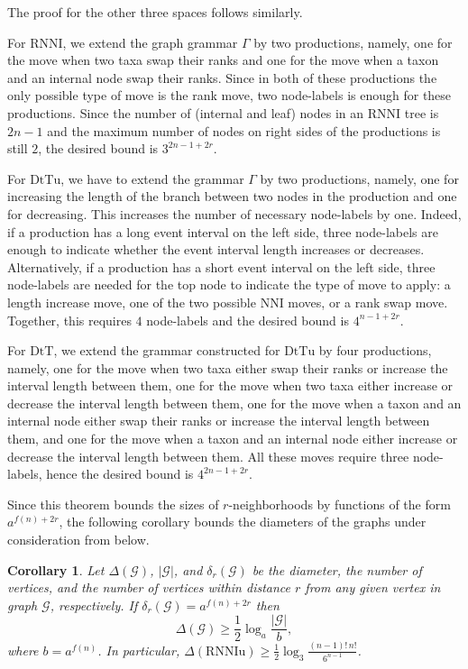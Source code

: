 \documentclass[11pt]{amsart}
\newtheorem{corollary}[lemma]{Corollary}
\theoremstyle{definition}
\newcommand{\nni}{\mathrm{NNI}}
\newcommand{\rnni}{\mathrm{RNNI}}
\newcommand{\rnniu}{\mathrm{RNNIu}}
\newcommand{\dtt}{\mathrm{DtT}}
\newcommand{\dttu}{\mathrm{DtTu}}
\newcommand{\G}{\mathcal{G}}
\begin{document}
The proof for the other three spaces follows similarly.

For $\rnni$, we extend the graph grammar $\Gamma$ by two productions, namely, one for the move when two taxa swap their ranks and one for the move when a taxon and an internal node swap their ranks.
Since in both of these productions the only possible type of move is the rank move, two node-labels is enough for these productions.
Since the number of (internal and leaf) nodes in an $\rnni$ tree is $2n - 1$ and the maximum number of nodes on right sides of the productions is still $2$, the desired bound is $3^{2n-1 + 2r}$.

For $\dttu$, we have to extend the grammar $\Gamma$ by two productions, namely, one for increasing the length of the branch between two nodes in the production and one for decreasing.
This increases the number of necessary node-labels by one.
Indeed, if a production has a long event interval on the left side, three node-labels are enough to indicate whether the event interval length increases or decreases.
Alternatively, if a production has a short event interval on the left side, three node-labels are needed for the top node to indicate the type of move to apply: a length increase move, one of the two possible $\nni$ moves, or a rank swap move.
Together, this requires $4$ node-labels and the desired bound is $4^{n-1 + 2r}$.

For $\dtt$, we extend the grammar constructed for $\dttu$ by four productions, namely, one for the move when two taxa either swap their ranks or increase the interval length between them, one for the move when two taxa either increase or decrease the interval length between them, one for the move when a taxon and an internal node either swap their ranks or increase the interval length between them, and one for the move when a taxon and an internal node either increase or decrease the interval length between them.
All these moves require three node-labels, hence the desired bound is $4^{2n-1 + 2r}$.
\endproof

Since this theorem bounds the sizes of $r$-neighborhoods by functions of the form $a^{f(n) + 2r}$, the following corollary bounds the diameters of the graphs under consideration from below.

\begin{corollary}
Let $\Delta(\G)$, $|\G|$, and $\delta_r(\G)$ be the diameter, the number of vertices, and the number of vertices within distance $r$ from any given vertex in graph $\G$, respectively.
If $\delta_r(\G) = a^{f(n) + 2r}$ then
\[
\Delta(\G) \geq \frac 12 \log_a\frac{|\G|}{b},
\]
where $b = a^{f(n)}$.
In particular, $\Delta(\rnniu) \geq \frac 12 \log_3\frac{(n-1)!\,n!}{6^{n-1}}$.
\end{corollary}
\end{document}
